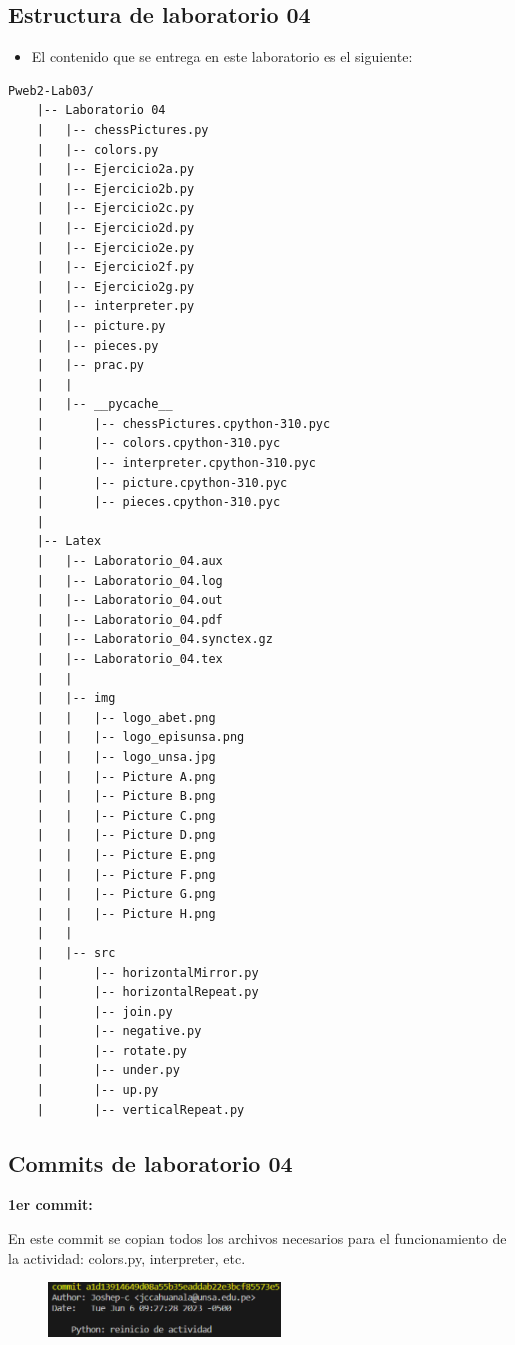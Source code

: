 \documentclass{article}
\begin{document}
	\subsection{Estructura de laboratorio 04}
	\begin{itemize}	
		\item El contenido que se entrega en este laboratorio es el siguiente:
	\end{itemize}
	
\begin{lstlisting}[style=ascii-tree]
	Pweb2-Lab03/
	|-- Laboratorio 04
	|   |-- chessPictures.py
	|   |-- colors.py
	|   |-- Ejercicio2a.py
	|   |-- Ejercicio2b.py
	|   |-- Ejercicio2c.py
	|   |-- Ejercicio2d.py
	|   |-- Ejercicio2e.py
	|   |-- Ejercicio2f.py
	|   |-- Ejercicio2g.py
	|   |-- interpreter.py
	|   |-- picture.py
	|   |-- pieces.py
	|   |-- prac.py
	|   |
	|   |-- __pycache__
	|       |-- chessPictures.cpython-310.pyc
	|       |-- colors.cpython-310.pyc
	|       |-- interpreter.cpython-310.pyc
	|       |-- picture.cpython-310.pyc
	|       |-- pieces.cpython-310.pyc
	|
	|-- Latex
	|   |-- Laboratorio_04.aux
	|   |-- Laboratorio_04.log
	|   |-- Laboratorio_04.out
	|   |-- Laboratorio_04.pdf
	|   |-- Laboratorio_04.synctex.gz
	|   |-- Laboratorio_04.tex
	|   |
	|   |-- img
	|   |   |-- logo_abet.png
	|   |   |-- logo_episunsa.png
	|   |   |-- logo_unsa.jpg
	|   |   |-- Picture A.png
	|   |   |-- Picture B.png
	|   |   |-- Picture C.png
	|   |   |-- Picture D.png
	|   |   |-- Picture E.png
	|   |   |-- Picture F.png
	|   |   |-- Picture G.png
	|   |   |-- Picture H.png
	|   |
	|   |-- src
	|       |-- horizontalMirror.py
	|       |-- horizontalRepeat.py
	|       |-- join.py
	|       |-- negative.py
	|       |-- rotate.py
	|       |-- under.py
	|       |-- up.py
	|       |-- verticalRepeat.py
\end{lstlisting}       

\subsection{Commits de laboratorio 04}

	\textbf{1er commit:}
	
	\vspace{0.3cm}
	En este commit se copian todos los archivos necesarios para el funcionamiento de la actividad:
	colors.py, interpreter, etc.
	\vspace{0.3cm}

	\begin{figure}[H]
		\centering
		\includegraphics[width=0.55\textwidth,keepaspectratio]{img/commit1.png}
	\end{figure}
	
\end{document}
